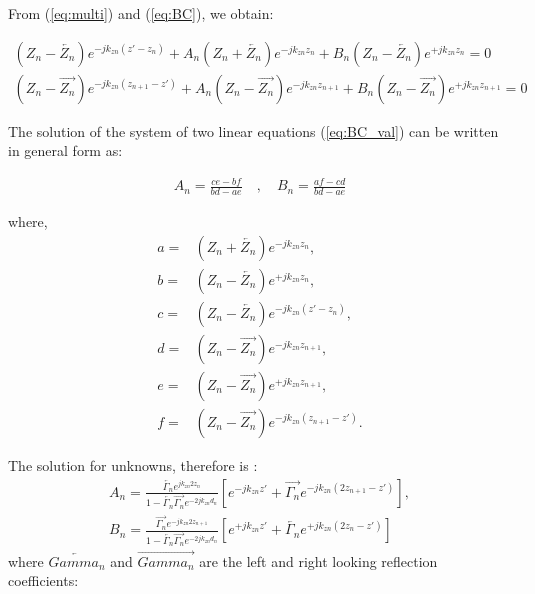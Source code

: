 \documentclass[11pt]{article}
\renewcommand{\^}{\hat}  %
\begin{document}
From (\ref{eq:multi}) and (\ref{eq:BC}), we obtain:

\begin{subequations}
  \begin{align}
    \left( Z_n - \overleftarrow{Z_n} \right) e^{-j k_{zn} (z' - z_n) } +  A_n\left( Z_n + \overleftarrow{Z_n} \right) e^{-j k_{zn} z_n } +
    B_n\left( Z_n - \overleftarrow{Z_n} \right) e^{+j k_{zn} z_n } = 0
    \label{eq:BC_at_left}\\
    \left( Z_n - \overrightarrow{Z_n} \right) e^{-j k_{zn} (z_{n+1} - z') } +  A_n\left( Z_n - \overrightarrow{Z_n} \right) e^{-j k_{zn} z_{n+1} } +
    B_n \left( Z_n - \overrightarrow{Z_n} \right) e^{+j k_{zn} z_{n+1} } = 0
    \label{eq:BC_at_right}
  \end{align}
  \label{eq:BC_val}
\end{subequations}

The solution of the system of two linear equations (\ref{eq:BC_val}) can be written in general form as:

\begin{align}
  A_n = \frac{ c e - b f }{bd - a e}\quad , \quad
  B_n = \frac{ a f - c d }{bd - a e}
  \label{eq:gen_sol}
\end{align}

where,
\begin{subequations}
  \begin{align}
    a ={}& \left( Z_n + \overleftarrow{Z_n} \right) e^{-j k_{zn} z_n },\\
    b ={}& \left( Z_n - \overleftarrow{Z_n} \right) e^{+j k_{zn} z_n },\\
    c ={}& \left( Z_n - \overleftarrow{Z_n} \right) e^{-j k_{zn} (z' - z_n)},\\
    d ={}& \left( Z_n - \overrightarrow{Z_n} \right) e^{-j k_{zn} z_{n+1} },\\
    e ={}& \left( Z_n - \overrightarrow{Z_n} \right) e^{+j k_{zn} z_{n+1} },\\
    f ={}& \left( Z_n - \overrightarrow{Z_n} \right) e^{-j k_{zn} (z_{n+1} - z') }.
    \label{eq:terms}
  \end{align}
\end{subequations}

The solution for unknowns, therefore is \cite[p. 1178]{michalski2005electromagnetic}:
\begin{subequations}
  \begin{align}
    A_n = \frac{\overleftarrow{\Gamma_n} e^{j k_{zn} 2z_n }}
    {1-\overleftarrow{\Gamma_n} \overrightarrow{\Gamma_n} e^{-2j k_{zn} d_{n} }}
    \left[ e^{-j k_{zn} z'} + \overrightarrow{\Gamma_n} e^{-j k_{zn} (2z_{n+1} -z')} \right],\\
    B_n = \frac{\overrightarrow{\Gamma_n} e^{-j k_{zn} 2z_{n+1} }}
    {1-\overleftarrow{\Gamma_n} \overrightarrow{\Gamma_n} e^{-2j k_{zn} d_{n} }}
    \left[ e^{+j k_{zn} z'} + \overleftarrow{\Gamma_n} e^{+j k_{zn} (2z_n -z')} \right]
    \label{eq:AnB}
  \end{align}
\end{subequations}
where $\overleftarrow{Gamma_n}$ and $\overrightarrow{Gamma_n}$ are the left and right looking reflection coefficients:
\end{document}
